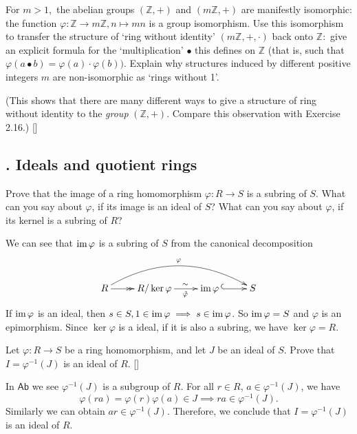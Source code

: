 \documentclass[12pt,letterpaper,boxed]{hmcpset}
\newcommand{\im}{\mathrm{im}\hspace{1.5pt}}
\newcommand{\Ab}{\mathsf{Ab}}
\begin{document}
\begin{problem}[2.15]
	For $m>1,$ the abelian groups $(\mathbb{Z},+)$ and $(m \mathbb{Z},+)$ are manifestly isomorphic: the function $\varphi: \mathbb{Z} \rightarrow m \mathbb{Z}, n \mapsto mn$ is a group isomorphism. Use this isomorphism to transfer the structure of `ring without identity' $(m \mathbb{Z},+, \cdot)$ back onto $\mathbb{Z}:$ give an explicit formula for the `multiplication' $\bullet$ this defines on $\mathbb{Z}$ (that is, such that $\varphi(a \bullet b)=\varphi(a) \cdot \varphi(b))$. Explain why structures induced by different positive integers $m$ are non-isomorphic as `rings without 1'.
	
	(This shows that there are many different ways to give a structure of ring without identity to the \emph{group} $(\mathbb{Z},+)$. Compare this observation with Exercise 2.16.) []
\end{problem}
\begin{solution}

\end{solution}


\subsection{. Ideals and quotient rings}

\begin{problem}[3.1]
Prove that the image of a ring homomorphism $\varphi: R \to S$ is a subring of $S$. What can you say about $\varphi$, if its image is an ideal of $S$? What can you say about $\varphi$, if its kernel is a subring of $R$?
\end{problem}
\begin{solution}
We can see that $\im \varphi$ is a subring of $S$ from the canonical decomposition
\[\xymatrix{
	R\ar@/^2pc/@{->}[rrr]^{\varphi}\ar@{->>}[r]^{}&R/\ker \varphi \ar@{->}[r]^{\hspace{1em}\sim\hspace{4pt}}_{\hspace{1em}\tilde{\varphi}\hspace{4pt}}&\im \varphi\hspace{2pt}\ar@{^{(}->}[r]^{}&S
}\] 
If $\im \varphi$ is an ideal, then $s\in S,1\in\im\varphi \implies s\in \im\varphi$. So $\im \varphi=S$ and $\varphi$ is an epimorphism. Since $\ker\varphi$ is a ideal, if it is also a subring, we have $\ker \varphi=R$.
\end{solution}

\hypertarget{Exercise III.3.2}{}
\begin{problem}[3.2]
Let $\varphi: R\to S$ be a ring homomorphism, and let $J$ be an ideal of $S$. Prove
that $I = \varphi^{-1}(J)$ is an ideal of $R$. []
\end{problem}
\begin{solution}
In $\Ab$ we see $\varphi^{-1}(J)$ is a subgroup of $R$. For all $r\in R$, $a\in \varphi^{-1}(J)$, we have
\[
\varphi(ra)=\varphi(r)\varphi(a)\in J\implies ra\in\varphi^{-1}(J).
\]
Similarly we can obtain $ar\in\varphi^{-1}(J)$. Therefore, we conclude that $I = \varphi^{-1}(J)$ is an ideal of $R$.
\end{solution}
\end{document}
